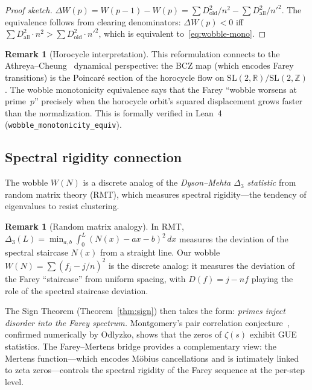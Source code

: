 \documentclass[11pt]{article}
\theoremstyle{definition}
\newtheorem{remark}[theorem]{Remark}
\newcommand{\Z}{\mathbb{Z}}
\newcommand{\R}{\mathbb{R}}
\begin{document}
\begin{proof}[Proof sketch]
$\Delta W(p) = W(p-1) - W(p) = \sum D^2_{\text{old}}/n^2 -
\sum D^2_{\text{all}}/{n'}^2$.  The equivalence follows from
clearing denominators: $\Delta W(p) < 0$ iff
$\sum D^2_{\text{all}} \cdot n^2 > \sum D^2_{\text{old}} \cdot {n'}^2$,
which is equivalent to~\eqref{eq:wobble-mono}.
\end{proof}

\begin{remark}[Horocycle interpretation]
This reformulation connects to the Athreya--Cheung~\cite{AthreyaCheung2014}
dynamical perspective: the BCZ map (which encodes Farey transitions)
is the Poincar\'e section of the horocycle flow on $\mathrm{SL}(2,\R)/\mathrm{SL}(2,\Z)$.
The wobble monotonicity equivalence says that the Farey
``wobble worsens at prime~$p$'' precisely when the horocycle
orbit's squared displacement grows faster than the normalization.
This is formally verified in Lean~4
(\texttt{wobble\_monotonicity\_equiv}).
\end{remark}

\subsection{Spectral rigidity connection}

The wobble $W(N)$ is a discrete analog of the \emph{Dyson--Mehta
$\Delta_3$ statistic} from random matrix theory (RMT), which measures
spectral rigidity---the tendency of eigenvalues to resist clustering.

\begin{remark}[Random matrix analogy]\label{rem:rmt}
In RMT, $\Delta_3(L) = \min_{a,b} \int_0^L (N(x) - ax - b)^2\,dx$
measures the deviation of the spectral staircase $N(x)$ from a
straight line.  Our wobble $W(N) = \sum (f_j - j/n)^2$ is the
discrete analog: it measures the deviation of the Farey ``staircase''
from uniform spacing, with $D(f) = j - nf$ playing the role of the
spectral staircase deviation.

The Sign Theorem (Theorem~\ref{thm:sign}) then takes the form:
\emph{primes inject disorder into the Farey spectrum.}
Montgomery's pair correlation conjecture~\cite{Montgomery1973},
confirmed numerically by Odlyzko, shows that the zeros of
$\zeta(s)$ exhibit GUE statistics.
The Farey--Mertens bridge provides a complementary view: the
Mertens function---which encodes M\"obius cancellations and is
intimately linked to zeta zeros---controls the spectral rigidity
of the Farey sequence at the per-step level.
\end{remark}
\end{document}
